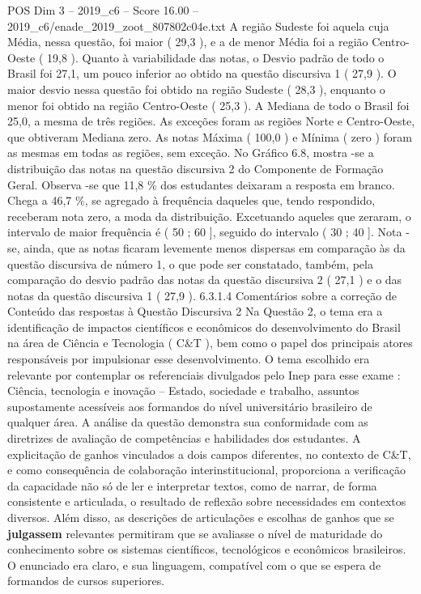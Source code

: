 \begin{textsample}{POS Dim 3 – 2019\_c6 – Score 16.00 – 2019\_c6/enade\_2019\_zoot\_807802c04e.txt}
A região Sudeste foi aquela cuja Média, nessa questão, foi maior ( 29,3 ), e a de menor Média foi a região Centro-Oeste ( 19,8 ).
Quanto à variabilidade das notas, o Desvio padrão de todo o Brasil foi 27,1, um pouco inferior ao obtido na questão discursiva 1 ( 27,9 ).
O maior desvio nessa questão foi obtido na região Sudeste ( 28,3 ), enquanto o menor foi obtido na região Centro-Oeste ( 25,3 ).
A Mediana de todo o Brasil foi 25,0, a mesma de três regiões.
As exceções foram as regiões Norte e Centro-Oeste, que obtiveram Mediana zero.
As notas Máxima ( 100,0 ) e Mínima ( zero ) foram as mesmas em todas as regiões, sem exceção.
No Gráfico 6.8, mostra -se a distribuição das notas na questão discursiva 2 do Componente de Formação Geral.
Observa -se que 11,8 \% dos estudantes deixaram a resposta em branco.
Chega a 46,7 \%, se agregado à frequência daqueles que, tendo respondido, receberam nota zero, a moda da distribuição.
Excetuando aqueles que zeraram, o intervalo de maior frequência é ( 50 ; 60 ], seguido do intervalo ( 30 ; 40 ].
Nota -se, ainda, que as notas ficaram levemente menos dispersas em comparação às da questão discursiva de número 1, o que pode ser constatado, também, pela comparação do desvio padrão das notas da questão discursiva 2 ( 27,1 ) e o das notas da questão discursiva 1 ( 27,9 ). 6.3.1.4 Comentários sobre a correção de Conteúdo das respostas à Questão Discursiva 2 Na Questão 2, o tema era a identificação de impactos científicos e econômicos do desenvolvimento do Brasil na área de Ciência e Tecnologia ( C\&T ), bem como o papel dos principais atores responsáveis por impulsionar esse desenvolvimento.
O tema escolhido era relevante por contemplar os referenciais divulgados pelo Inep para esse exame : Ciência, tecnologia e inovação – Estado, sociedade e trabalho, assuntos supostamente acessíveis aos formandos do nível universitário brasileiro de qualquer área.
A análise da questão demonstra sua conformidade com as diretrizes de avaliação de competências e habilidades dos estudantes.
A explicitação de ganhos vinculados a dois campos diferentes, no contexto de C\&T, e como consequência de colaboração interinstitucional, proporciona a verificação da capacidade não só de ler e interpretar textos, como de narrar, de forma consistente e articulada, o resultado de reflexão sobre necessidades em contextos diversos.
Além disso, as descrições de articulações e escolhas de ganhos que se \textbf{julgassem} relevantes permitiram que se avaliasse o nível de maturidade do conhecimento sobre os sistemas científicos, tecnológicos e econômicos brasileiros.
O enunciado era claro, e sua linguagem, compatível com o que se espera de formandos de cursos superiores.

\end{textsample}
